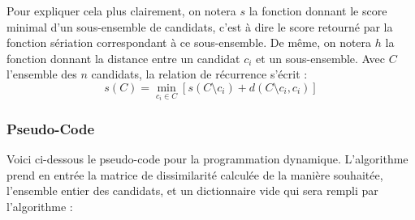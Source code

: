 \documentclass[11pt, a4paper]{article}
\begin{document}
Pour expliquer cela plus clairement, on notera $s$ la fonction donnant le score minimal d'un sous-ensemble de candidats, c'est à dire le score retourné par la fonction sériation correspondant à ce sous-ensemble. De même, on notera $h$ la fonction donnant la distance entre un candidat $c_i$ et un sous-ensemble. Avec $C$ l'ensemble des $n$ candidats, la relation de récurrence s'écrit :
\[
s(C) = \min_{c_i \in C} [s(C \setminus c_i) + d(C \setminus c_i, c_i)]
\]

\subsubsection{Pseudo-Code}

\noindent Voici ci-dessous le pseudo-code pour la programmation dynamique. L'algorithme prend en entrée la matrice de dissimilarit\'{e} calcul\'{e}e de la mani\`{e}re souhait\'{e}e, l'ensemble entier des candidats, et un dictionnaire vide qui sera rempli par l'algorithme :\\
\end{document}
